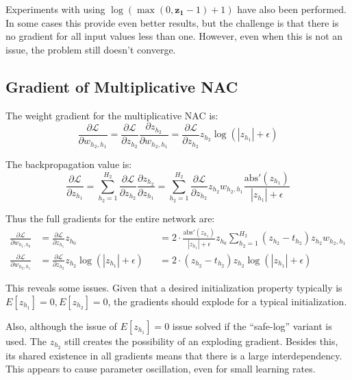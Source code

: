 \documentclass[a4paper]{article}
\begin{document}
Experiments with using $\log(\max(0, \mathbf{z_1} - 1) + 1)$ have also been performed. In some cases this provide even better results, but the challenge is that there is no gradient for all input values less than one. However, even when this is not an issue, the problem still doesn't converge.

\subsection{Gradient of Multiplicative NAC}

The weight gradient for the multiplicative NAC is:
\begin{equation}
\frac{\partial \mathcal{L}}{\partial w_{h_2, h_1}} = \frac{\partial \mathcal{L}}{\partial z_{h_2}} \frac{\partial z_{h_2}}{\partial w_{h_2, h_1}} = \frac{\partial \mathcal{L}}{\partial z_{h_2}} z_{h_2} \log(|z_{h_1}| + \epsilon)
\end{equation}

The backpropagation value is:
\begin{equation}
\frac{\partial \mathcal{L}}{\partial z_{h_1}} = \sum_{h_2 = 1}^{H_2} \frac{\partial \mathcal{L}}{\partial z_{h_2}} \frac{\partial z_{h_2}}{\partial z_{h_1}} = \sum_{h_2 = 1}^{H_2} \frac{\partial \mathcal{L}}{\partial z_{h_2}} z_{h_2} w_{h_2, h_1} \frac{\mathrm{abs}'(z_{h_1})}{|z_{h_1}| + \epsilon}
\end{equation}

Thus the full gradients for the entire network are:
\begin{equation*}
\begin{aligned}
\frac{\partial \mathcal{L}}{\partial w_{h_1, h_0}} &= \frac{\partial \mathcal{L}}{\partial z_{h_1}} z_{h_0} &&= 2 \cdot \frac{\mathrm{abs}'(z_{h_1})}{|z_{h_1}| + \epsilon} z_{h_0} \sum_{h_2 = 1}^{H_2} (z_{h_2} - t_{h_2}) z_{h_2} w_{h_2, h_1} \\
\frac{\partial \mathcal{L}}{\partial w_{h_2, h_1}} &= \frac{\partial \mathcal{L}}{\partial z_{h_2}} z_{h_2} \log(|z_{h_1}| + \epsilon) &&= 2 \cdot (z_{h_2} - t_{h_2}) z_{h_2} \log(|z_{h_1}| + \epsilon)
\end{aligned}
\end{equation*}

This reveals some issues. Given that a desired initialization property typically is $E[z_{h_1}] = 0, E[z_{h_2}] = 0$, the gradients should explode for a typical initialization.

Also, although the issue of $E[z_{h_1}] = 0$ issue solved if the ``safe-log'' variant is used. The $z_{h_2}$ still creates the possibility of an exploding gradient. Besides this, its shared existence in all gradients means that there is a large interdependency. This appears to cause parameter oscillation, even for small learning rates.
\end{document}
